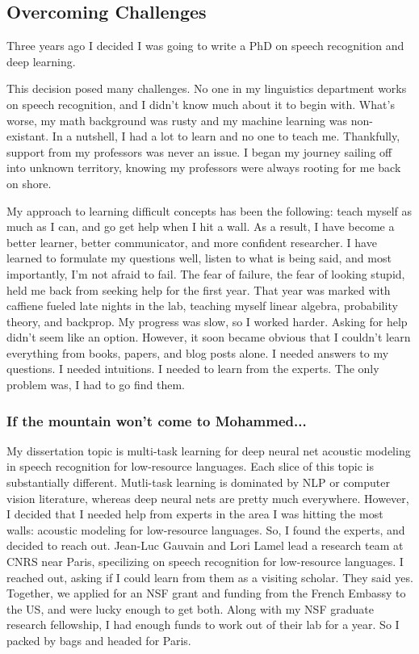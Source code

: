 \documentclass[12pt,a4paper]{article}
\begin{document}
\subsection*{Overcoming Challenges}

Three years ago I decided I was going to write a PhD on speech recognition and deep learning.

This decision posed many challenges. No one in my linguistics department works on speech recognition, and I didn't know much about it to begin with. What's worse, my math background was rusty and my machine learning was non-existant. In a nutshell, I had a lot to learn and no one to teach me. Thankfully, support from my professors was never an issue.  I began my journey sailing off into unknown territory, knowing my professors were always rooting for me back on shore.

My approach to learning difficult concepts has been the following: teach myself as much as I can, and go get help when I hit a wall. As a result, I have become a better learner, better communicator, and more confident researcher. I have learned to formulate my questions well, listen to what is being said, and most importantly, I'm not afraid to fail. The fear of failure, the fear of looking stupid, held me back from seeking help for the first year. That year was marked with caffiene fueled late nights in the lab, teaching myself linear algebra, probability theory, and backprop. My progress was slow, so I worked harder. Asking for help didn't seem like an option. However, it soon became obvious that I couldn't learn everything from books, papers, and blog posts alone. I needed answers to my questions. I needed intuitions. I needed to learn from the experts. The only problem was, I had to go find them.

\subsubsection*{If the mountain won't come to Mohammed...}

My dissertation topic is multi-task learning for deep neural net acoustic modeling in speech recognition for low-resource languages. Each slice of this topic is substantially different. Mutli-task learning is dominated by NLP or computer vision literature, whereas deep neural nets are pretty much everywhere. However, I decided that I needed help from experts in the area I was hitting the most walls: acoustic modeling for low-resource languages. So, I found the experts, and decided to reach out. Jean-Luc Gauvain and Lori Lamel lead a research team at CNRS near Paris, specilizing on speech recognition for low-resource languages. I reached out, asking if I could learn from them as a visiting scholar. They said yes. Together, we applied for an NSF grant and funding from the French Embassy to the US, and were lucky enough to get both. Along with my NSF graduate research fellowship, I had enough funds to work out of their lab for a year. So I packed by bags and headed for Paris.
\end{document}
